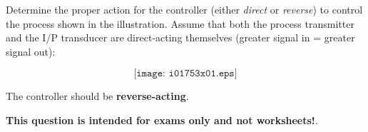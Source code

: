 

Determine the proper action for the controller (either {\it direct} or {\it reverse}) to control the process shown in the illustration.  Assume that both the process transmitter and the I/P transducer are direct-acting themselves (greater signal in = greater signal out):

$$\texttt{[image: i01753x01.eps]}$$







The controller should be {\bf reverse-acting}.







{\bf This question is intended for exams only and not worksheets!}.



